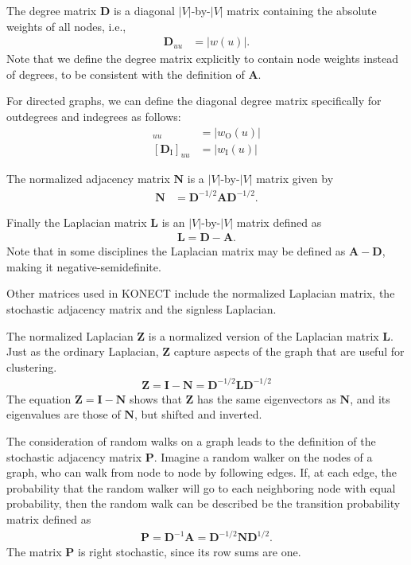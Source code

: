 \documentclass{article}
\begin{document}
The degree matrix $\mathbf D$ is a diagonal $|V|$-by-$|V|$ matrix containing
the absolute weights of all nodes, i.e.,
\begin{align}
  \mathbf D_{uu} &= |w(u)|. 
\end{align}
Note that we define the degree matrix explicitly to contain node weights
instead of degrees, to be consistent with the definition of $\mathbf
A$. 

For directed graphs, we can define the diagonal degree matrix
specifically for outdegrees and indegrees as follows:
\begin{align}
  [\mathbf D_{\mathrm O}]_{uu} &= |w_{\mathrm O}(u)| \\
  [\mathbf D_{\mathrm I}]_{uu} &= |w_{\mathrm I}(u)| 
\end{align}

The normalized adjacency matrix $\mathbf N$ is a $|V|$-by-$|V|$ matrix
given by
\begin{align}
  \mathbf N &= \mathbf D^{-1/2} \mathbf A \mathbf D^{-1/2}. 
\end{align}

Finally the Laplacian matrix $\mathbf L$ is an $|V|$-by-$|V|$ matrix
defined as
\begin{align}
  \mathbf L = \mathbf D - \mathbf A. 
\end{align}
Note that in some disciplines the Laplacian matrix may be defined as
$\mathbf A - \mathbf D$, making it negative-semidefinite. 

Other matrices used in KONECT include the
normalized Laplacian matrix, the stochastic adjacency matrix and the
signless Laplacian. 

The normalized Laplacian $\mathbf Z$ is a normalized version of the Laplacian matrix
$\mathbf L$.  Just as the ordinary Laplacian, $\mathbf Z$ capture
aspects of the graph that are useful for clustering. 
\begin{align}
  \mathbf Z = \mathbf I - \mathbf N = \mathbf D^{-1/2} \mathbf L \mathbf
  D^{-1/2}
\end{align}
The equation $\mathbf Z = \mathbf I - \mathbf N$ shows that $\mathbf Z$
has the same eigenvectors as $\mathbf N$, and its eigenvalues are those
of $\mathbf N$, but shifted and inverted. 

The consideration of random walks on a graph leads to the definition of
the stochastic adjacency matrix $\mathbf P$.  Imagine a random walker on
the nodes of a graph, who can walk from node to node by following
edges.  If, at each edge, the probability that the random walker will go
to each neighboring node with equal probability, then the random walk
can be described be the transition probability matrix defined as
\begin{align}
  \mathbf P = \mathbf D^{-1} \mathbf A = \mathbf D^{-1/2} \mathbf N
  \mathbf D^{1/2}.
\end{align}
The matrix $\mathbf P$ is right stochastic, since its row sums are one. 
\end{document}
